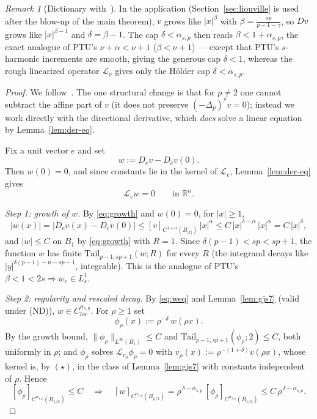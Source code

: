 \documentclass[11pt]{amsart}
\theoremstyle{plain}
\theoremstyle{definition}
\theoremstyle{remark}
\newtheorem{remark}[theorem]{Remark}
\newcommand{\R}{\mathbb{R}}
\newcommand{\fpl}[1]{(-\Delta_p)^{s}#1}
\newcommand{\Lv}{\mathcal L_{v}}
\newcommand{\asp}{\alpha_{s,p}}
\begin{document}
\begin{remark}[Dictionary with~\cite{PTU}]\label{rem:dict}
In the application (Section~\ref{sec:liouville} is used after the blow-up of the
main theorem), $v$ grows like $|x|^{\beta}$ with $\beta=\frac{sp}{p-1-\gamma}$,
so $Dv$ grows like $|x|^{\beta-1}$ and $\delta=\beta-1$. The cap
$\delta<\asp$ then reads $\beta<1+\asp$, the exact analogue of PTU's
$\nu+\alpha<\nu+1$ ($\beta<\nu+1$) --- except that PTU's $s$-harmonic increments
are smooth, giving the generous cap $\delta<1$, whereas the rough linearized
operator $\Lv$ gives only the H\"older cap $\delta<\asp$.
\end{remark}

\begin{proof}
We follow~\cite[Thm 3.1, Step 1]{PTU}. The one structural change is that for
$p\ne2$ one cannot subtract the affine part of $v$ (it does not preserve
$\fpl{v}=0$); instead we work directly with the directional derivative, which
\emph{does} solve a linear equation by Lemma~\ref{lem:der-eq}.

Fix a unit vector $e$ and set
\[
  w:=D_e v-D_e v(0).
\]
Then $w(0)=0$, and since constants lie in the kernel of $\Lv$,
Lemma~\ref{lem:der-eq} gives
\begin{equation}\label{eq:weq}
  \Lv w=0\qquad\text{in }\R^n .
\end{equation}

\emph{Step 1: growth of $w$.} By \eqref{eq:growth} and $w(0)=0$, for $|x|\ge1$,
\[
  |w(x)|=|D_e v(x)-D_e v(0)|\le [v]_{C^{1+\alpha}(B_{|x|})}\,|x|^{\alpha}
   \le C\,|x|^{\delta-\alpha}\,|x|^{\alpha}=C\,|x|^{\delta},
\]
and $|w|\le C$ on $B_1$ by \eqref{eq:growth} with $R=1$. Since
$\delta(p-1)<sp<sp+1$, the function $w$ has finite
$\mathrm{Tail}_{p-1,sp+1}(w;R)$ for every $R$ (the integrand decays like
$|y|^{\delta(p-1)-n-sp-1}$, integrable). This is the analogue of PTU's
$\beta<1<2s\Rightarrow w_e\in L^1_s$.

\emph{Step 2: regularity and rescaled decay.} By \eqref{eq:weq} and
Lemma~\ref{lem:gjs7} (valid under \textnormal{(ND)}), $w\in C^{\asp}_{loc}$. For
$\rho\ge1$ set
\[
  \phi_\rho(x):=\rho^{-\delta}\,w(\rho x).
\]
By the growth bound, $\|\phi_\rho\|_{L^\infty(B_1)}\le C$ and
$\mathrm{Tail}_{p-1,sp+1}(\phi_\rho;2)\le C$, both uniformly in $\rho$; and
$\phi_\rho$ solves $\mathcal L_{v_\rho}\phi_\rho=0$ with
$v_\rho(x):=\rho^{-(1+\delta)}v(\rho x)$, whose kernel is, by $(\star)$, in the
class of Lemma~\ref{lem:gjs7} with constants independent of $\rho$. Hence
\[
  [\phi_\rho]_{C^{\asp}(B_{1/2})}\le C\quad\Longrightarrow\quad
  [w]_{C^{\asp}(B_{\rho/2})}=\rho^{\,\delta-\asp}\,[\phi_\rho]_{C^{\asp}(B_{1/2})}
   \le C\,\rho^{\,\delta-\asp}.
\]


\end{proof}
\end{document}

